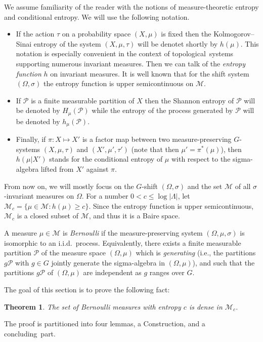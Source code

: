 \documentclass{amsart}
\newtheorem{thm}{Theorem}[section]
\theoremstyle{remark}
\def \M {\mathcal M}
\def \P {\mathcal P}
\def \tl {topological}
\def \im {invariant measure}
\begin{document}
We assume familiarity of the reader with the notions of measure-theoretic entropy and conditional entropy. We will use the following notation.
\begin{itemize}
\item If the action $\tau$ on a probability space $(X,\mu)$ is fixed then the Kolmogorov--Sinai entropy of the system $(X,\mu,\tau)$ will be denotet shortly by $h(\mu)$. This notation is especially convenient in the context of \tl\ systems supporting numerous \im s. Then we can talk of the \emph{entropy function} $h$ on \im s. It is well known that for the shift system $(\Omega,\sigma)$ the entropy function is upper semicontinuous on $\M$. 
\item If $\P$ is a finite measurable partition of $X$ then the Shannon entropy of $\P$ will be denoted by $H_\mu(\P)$ while the entropy of the process generated by $\P$ will be denoted by $h_\mu(\P)$.
\item Finally, if $\pi:X\mapsto X'$ is a factor map between two measure-preserving $G$-systems $(X,\mu,\tau)$ and $(X',\mu',\tau')$ (note that then $\mu'=\pi^*(\mu)$), then $h(\mu|X')$ stands for the conditional entropy of $\mu$ with respect to the sigma-algebra lifted from $X'$ against $\pi$.
\end{itemize}

From now on, we will mostly focus on the $G$-shift $(\Omega,\sigma)$ and the set $\M$ of all $\sigma$-\im s on $\Omega$.
For a number $0<c\le\log|\Lambda|$, let $\M_c=\{\mu\in\M: h(\mu)\ge c\}$. Since the entropy function is upper semicontinuous, $\M_c$ is a closed subset of $\M$, and thus it is a Baire space.

A measure $\mu\in\M$ is \emph{Bernoulli} if the measure-preserving system $(\Omega,\mu,\sigma)$ is isomorphic to an i.i.d.\ process. Equivalently, there exists a finite measurable partition $\P$ of the measure space $(\Omega,\mu)$ which is \emph{generating} (i.e., the partitions $g\P$ with $g\in G$ jointly generate the sigma-algebra in $(\Omega,\mu)$), and such that the partitions $g\P$ of $(\Omega,\mu)$ are independent as $g$ ranges over $G$.

The goal of this section is to prove the following fact:

\begin{thm}\label{T1} The set of Bernoulli measures with entropy $c$ is dense in $\M_c$.
\end{thm}

The proof is partitioned into four lemmas, a Construction, and a concluding~part.
\end{document}
